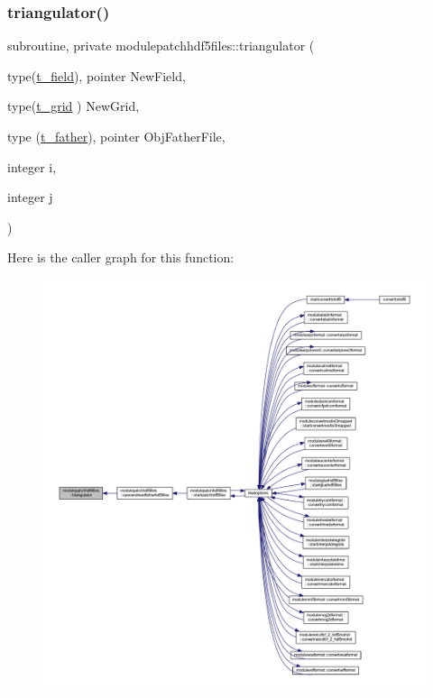 \subsubsection{\texorpdfstring{triangulator()}{triangulator()}}
{\footnotesize\ttfamily subroutine, private modulepatchhdf5files\+::triangulator (\begin{DoxyParamCaption}\item[{type(\mbox{\hyperlink{structmodulepatchhdf5files_1_1t__field}{t\+\_\+field}}), pointer}]{New\+Field,  }\item[{type(\mbox{\hyperlink{structmodulepatchhdf5files_1_1t__grid}{t\+\_\+grid}} )}]{New\+Grid,  }\item[{type (\mbox{\hyperlink{structmodulepatchhdf5files_1_1t__father}{t\+\_\+father}}), pointer}]{Obj\+Father\+File,  }\item[{integer}]{i,  }\item[{integer}]{j }\end{DoxyParamCaption})\hspace{0.3cm}{\ttfamily [private]}}

Here is the caller graph for this function\+:\nopagebreak
\begin{figure}[H]
\begin{center}
\leavevmode
\includegraphics[width=350pt]{namespacemodulepatchhdf5files_a5d3c460838e5e6b1caa6735da5973943_icgraph}
\end{center}
\end{figure}


